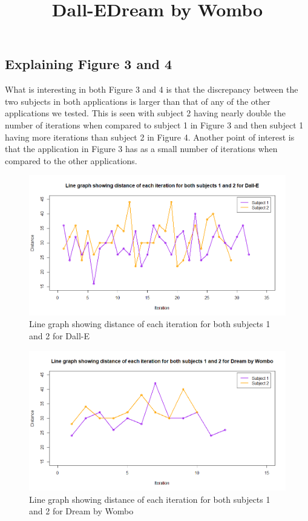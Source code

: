 \documentclass[]{report}
\begin{document}
	\subsection{Explaining Figure 3 and 4}
	
	What is interesting in both Figure 3 and 4 is that the discrepancy between the two subjects in both applications is larger than that of any of the other applications we tested. This is seen with subject 2 having nearly double the number of iterations when compared to subject 1 in Figure 3 and then subject 1 having more iterations than subject 2 in Figure 4. Another point of interest is that the application in Figure 3 has as a small number of iterations when compared to the other applications. 
	\begin{figure}[!htbp]
		\centering
		\bfseries
		\title{Dall-E}
		\includegraphics[width=1\linewidth, trim=0 0 0 50, clip]{LineGraphDall-E}
		\caption{Line graph showing distance of each iteration for both subjects 1 and 2 for Dall-E}
		\label{fig:linegraphdall-e}
	\end{figure}
	
	\begin{figure}[!htbp]
		\centering
		\bfseries
		\title{Dream by Wombo}
		\includegraphics[width=1\linewidth, trim=0 0 0 50, clip]{LineGraphDBW}
		\caption{Line graph showing distance of each iteration for both subjects 1 and 2 for Dream by Wombo}
		\label{fig:linegraphdbw}
	\end{figure}
	
\end{document}
